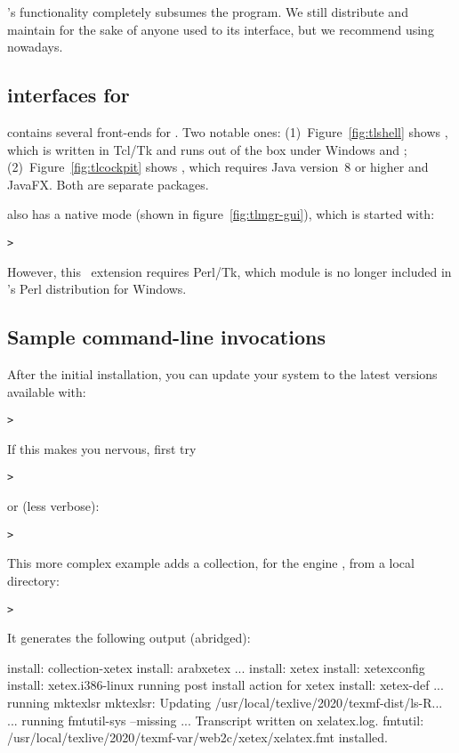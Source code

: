 \documentclass{article}
\begin{document}
's functionality completely subsumes the 
program.  We still distribute and maintain  for the sake
of anyone used to its interface, but we recommend using 
nowadays.

\subsection{\GUI{} interfaces for }

\TL{} contains several \GUI{} front-ends for . Two notable
ones: (1)~Figure~\ref{fig:tlshell} shows , which is
written in Tcl/Tk and runs out of the box under Windows and \MacOSX;
(2)~Figure~\ref{fig:tlcockpit} shows , which requires
Java version~8 or higher and JavaFX. Both are separate packages.

 also has a native \GUI{} mode (shown in
figure~\ref{fig:tlmgr-gui}), which is started with:
\begin{alltt}
> 
\end{alltt}
However, this \GUI\ extension requires Perl/Tk, which module is no
longer included in \TL's Perl distribution for Windows.

\subsection{Sample  command-line invocations}

After the initial installation, you can update your system to the latest
versions available with:
\begin{alltt}
> 
\end{alltt}
If this makes you nervous, first try
\begin{alltt}
> 
\end{alltt}
or (less verbose):
\begin{alltt}
> 
\end{alltt}

This more complex example adds a collection, for the engine \XeTeX, from
a local directory:

\begin{alltt}
> 
\end{alltt}
It generates the following output (abridged):
\begin{fverbatim}
install: collection-xetex
install: arabxetex
...
install: xetex
install: xetexconfig
install: xetex.i386-linux
running post install action for xetex
install: xetex-def
...
running mktexlsr
mktexlsr: Updating /usr/local/texlive/2020/texmf-dist/ls-R...
...
running fmtutil-sys --missing
...
Transcript written on xelatex.log.
fmtutil: /usr/local/texlive/2020/texmf-var/web2c/xetex/xelatex.fmt installed.
\end{fverbatim}
\end{document}
